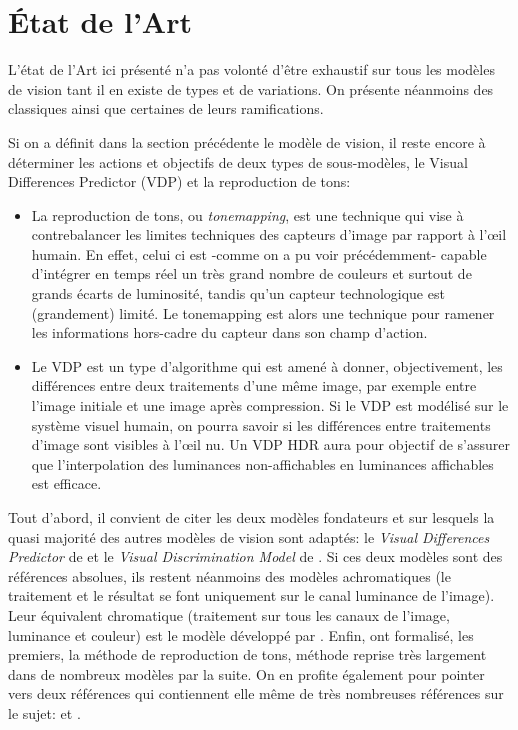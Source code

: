 	\chapter{État de l'Art}
	\par L'état de l'Art ici présenté n'a pas volonté d'être exhaustif sur tous les modèles de vision tant il en existe de types et de variations. On présente néanmoins des classiques ainsi que certaines de leurs ramifications.
	
	\par Si on a définit dans la section précédente le modèle de vision, il reste encore à déterminer les actions et objectifs de deux types de sous-modèles, le Visual Differences Predictor (VDP) et la reproduction de tons:
	\begin{itemize}
		\item La reproduction de tons, ou \textit{tonemapping}, est une technique qui vise à contrebalancer les limites techniques des capteurs d'image par rapport à l'œil humain. En effet, celui ci est -comme on a pu voir précédemment- capable d'intégrer en temps réel un très grand nombre de couleurs et surtout de grands écarts de luminosité, tandis qu'un capteur technologique est (grandement) limité. Le tonemapping est alors une technique pour ramener les informations hors-cadre du capteur dans son champ d'action.
		\item Le VDP est un type d'algorithme qui est amené à donner, objectivement, les différences entre deux traitements d'une même image, par exemple entre l'image initiale et une image après compression. Si le VDP est modélisé sur le système visuel humain, on pourra savoir si les différences entre traitements d'image sont visibles à l'œil nu. Un VDP HDR aura pour objectif de s'assurer que l'interpolation des luminances non-affichables en luminances affichables est efficace.
	\end{itemize}
	
	\par Tout d'abord, il convient de citer les deux modèles fondateurs et sur lesquels la quasi majorité des autres modèles de vision sont adaptés: le \textit{Visual Differences Predictor} de \citep{daly_visible_1992} et le \textit{Visual Discrimination Model} de \citep{lubin_visual_1995}. Si ces deux modèles sont des références absolues, ils restent néanmoins des modèles achromatiques (le traitement et le résultat se font uniquement sur le canal luminance de l'image). Leur équivalent chromatique (traitement sur tous les canaux de l'image, luminance et couleur) est le modèle développé par \citep{pattanaik_multiscale_1998}. Enfin, \citep{rushmeier_comparing_1995} ont formalisé, les premiers, la méthode de reproduction de tons, méthode reprise très largement dans de nombreux modèles par la suite. On en profite également pour pointer vers deux références qui contiennent elle même de très nombreuses références sur le sujet: \citep{moreau_traite_2006} et \citep{bradley_wavelet_1999}.
	
